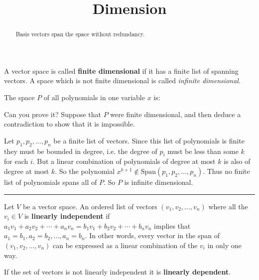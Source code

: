 \documentclass{ximera}
\title{Dimension}
\begin{document}
\begin{abstract}
  Basis vectors span the space without redundancy.
\end{abstract}

  \begin{definition}
    A vector space is called \textbf{finite dimensional} if it has a finite list of spanning vectors.  A space which is not finite dimensional is called \textit{infinite dimensional}.
 \end{definition}

 \begin{question}
   The space $P$ of all polynomials in one variable $x$ is:

   \begin{solution}
     \begin{multiple-choice}
     \end{multiple-choice}
   \end{solution}

   Can you prove it?  Suppose that $P$ were finite dimensional, and then deduce a contradiction to show that it is impossible.

   \begin{free-response}
     Let $p_1,p_2,\ldots,p_n$ be a finite list of  vectors.  
     Since this list of polynomials is finite they must be bounded in degree, i.e.  the degree of $p_i$ must be less than some $k$ for each $i$.  But a linear combination
     of polynomials of degree at most $k$ is also of degree at most $k$.  So the polynomial $x^{k+1} \not\in  \textrm{Span}(p_1,p_2,\ldots,p_n)$. Thus no finite list of 
     polynomials spans all of $P$.  So $P$ is infinite dimensional.
   \end{free-response}

 \end{question}

\hrule

 \begin{definition}
   Let $V$ be a vector space. An ordered list of vectors $(v_1,v_2,\ldots,v_n)$ where all the $v_i \in V$ is \textbf{linearly independent} if
   $a_1v_1+a_2v_2 + \cdots +a_nv_n = b_1v_1 + b_2v_2 + \cdots + b_nv_n$ implies that $a_1  = b_1, a_2 = b_2, \ldots,a_n=b_n$.  In other words,
   every vector in the span of $(v_1,v_2,\ldots,v_n)$ can be expressed as a linear combination of the $v_i$ in only one way.  
   
   If the set of vectors is not linearly independent it is \textbf{linearly dependent}.
 \end{definition}
 
\end{document}
